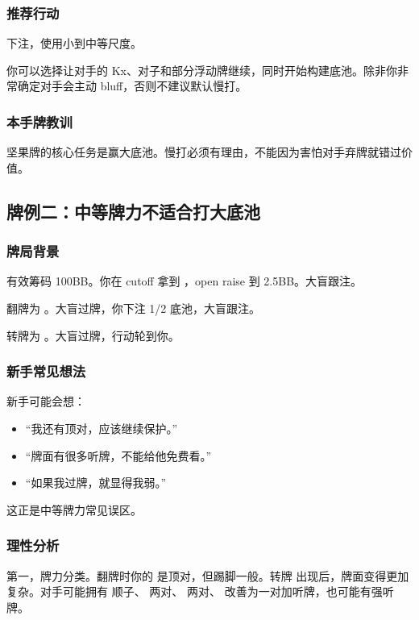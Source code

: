 \subsubsection*{推荐行动}

下注，使用小到中等尺度。

你可以选择让对手的 Kx、对子和部分浮动牌继续，同时开始构建底池。除非你非常确定对手会主动 bluff，否则不建议默认慢打。

\subsubsection*{本手牌教训}

坚果牌的核心任务是赢大底池。慢打必须有理由，不能因为害怕对手弃牌就错过价值。

\subsection{牌例二：中等牌力不适合打大底池}

\subsubsection*{牌局背景}

有效筹码 100BB。你在 cutoff 拿到 ，open raise 到 2.5BB。大盲跟注。

翻牌为 。大盲过牌，你下注 1/2 底池，大盲跟注。

转牌为 。大盲过牌，行动轮到你。

\subsubsection*{新手常见想法}

新手可能会想：

\begin{itemize}
\item “我还有顶对，应该继续保护。”
\item “牌面有很多听牌，不能给他免费看。”
\item “如果我过牌，就显得我弱。”
\end{itemize}

这正是中等牌力常见误区。

\subsubsection*{理性分析}

第一，牌力分类。翻牌时你的  是顶对，但踢脚一般。转牌  出现后，牌面变得更加复杂。对手可能拥有  顺子、 两对、 两对、 改善为一对加听牌，也可能有强听牌。

